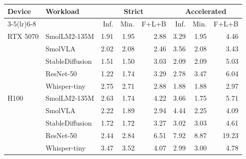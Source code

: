 \begin{tabular}{llrrrrrr}
\toprule
Device & Workload & \multicolumn{3}{c}{Strict} & \multicolumn{3}{c}{Accelerated} \\ \cmidrule(lr){3-5}\cmidrule(lr){6-8} & & Inf. & Min. & F+L+B & Inf. & Min. & F+L+B \\
\midrule
RTX 5070 & SmolLM2-135M & 1.91 & 1.95 & 2.88 & 3.29 & 1.95 & 4.46 \\
 & SmolVLA & 2.02 & 2.08 & 2.46 & 3.56 & 2.08 & 3.43 \\
 & StableDiffusion & 1.51 & 1.50 & 3.03 & 2.09 & 2.09 & 5.03 \\
 & ResNet-50 & 1.22 & 1.74 & 3.29 & 2.78 & 3.47 & 6.04 \\
 & Whisper-tiny & 2.75 & 2.71 & 2.88 & 1.88 & 1.88 & 2.97 \\
H100 & SmolLM2-135M & 2.63 & 1.74 & 4.22 & 3.66 & 1.75 & 5.71 \\
 & SmolVLA & 2.22 & 1.89 & 2.94 & 4.44 & 2.25 & 4.09 \\
 & StableDiffusion & 1.72 & 1.72 & 3.27 & 3.02 & 3.03 & 4.61 \\
 & ResNet-50 & 2.44 & 2.84 & 6.51 & 7.92 & 8.87 & 19.23 \\
 & Whisper-tiny & 3.47 & 3.52 & 4.07 & 2.99 & 3.00 & 4.78 \\
\bottomrule
\end{tabular}
